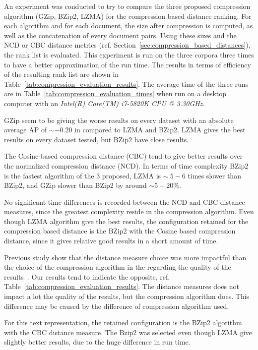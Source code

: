 An experiment was conducted to try to compare the three proposed compression algorithm (GZip, BZip2, LZMA) for the compression based distance ranking.
For each algorithm and for each document, the size after compression is computed, as well as the concatenation of every document pairs.
Using these sizes and the NCD or CBC distance metrics (ref. Section~\ref{sec:compression_based_distances}), the rank list is evaluated.
This experiment is run on the three corpora three times to have a better approximation of the run time.
The results in terms of efficiency of the resulting rank list are shown in Table~\ref{tab:compression_evaluation_results}.
The average time of the three runs are in Table~\ref{tab:compression_evaluation_times} when run on a desktop computer with an \textit{Intel(R) Core(TM) i7-5820K CPU @ 3.30GHz}.

GZip seem to be giving the worse results on every dataset with an absolute average AP of $\sim -0.20$ in compared to LZMA and BZip2.
LZMA gives the best results on every dataset tested, but BZip2 have close results.

The Cosine-based compression distance (CBC) tend to give better results over the normalized compression distance (NCD).
In terms of time complexity BZip2 is the fastest algorithm of the 3 proposed, LZMA is $\sim ~5-6$ times slower than BZip2, and GZip slower than BZip2 by around $\sim 5-20$\%.

No significant time differences is recorded between the NCD and CBC distance measures, since the greatest complexity reside in the compression algorithm.
Even though LZMA algorithm give the best results, the configuration retained for the compression based distance is the BZip2 with the Cosine based compression distance, since it gives relative good results in a short amount of time.

Previous study show that the distance measure choice was more impactful than the choice of the compression algorithm in the regarding the quality of the results~\cite{comparing_compression}.
Our results tend to indicate the opposite, ref. Table~\ref{tab:compression_evaluation_results}.
The distance measures does not impact a lot the quality of the results, but the compression algorithm does.
This difference may be caused by the difference of compression algorithm used.

For this text representation, the retained configuration is the BZip2 algorithm with the CBC distance measure.
The Bzip2 was selected even though LZMA give slightly better results, due to the huge difference in run time.

